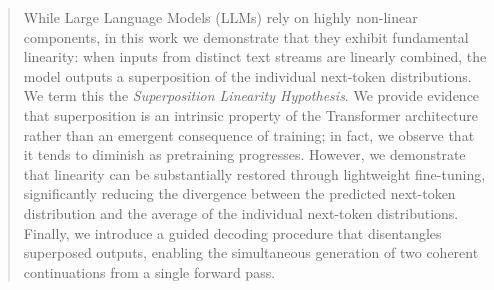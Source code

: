 \documentclass{article}
\theoremstyle{plain}
\theoremstyle{definition}
\theoremstyle{remark}
\begin{document}

\printAffiliationsAndNotice{}  

\begin{abstract}

While Large Language Models (LLMs) rely on highly non-linear components, in this work we demonstrate that they exhibit fundamental linearity: when inputs from distinct text streams are linearly combined, the model outputs a superposition of the individual next-token distributions. We term this the \textit{Superposition Linearity Hypothesis}. We provide evidence that superposition is an intrinsic property of the Transformer architecture rather than an emergent consequence of training; in fact, we observe that it tends to diminish as pretraining progresses. However, we demonstrate that linearity can be substantially restored through lightweight fine-tuning, significantly reducing the divergence between the predicted next-token distribution and the average of the individual next-token distributions. Finally, we introduce a guided decoding procedure that disentangles superposed outputs, enabling the simultaneous generation of two coherent continuations from a single forward pass.
\end{abstract}
\end{document}
